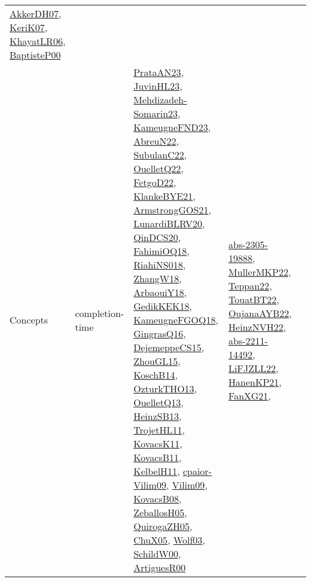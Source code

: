 {\begin{longtable}{lp{3cm}>{\raggedright}p{6cm}>{\raggedright}p{6cm}p{8cm}}
\href{papers/AkkerDH07.pdf}{AkkerDH07}\cite{AkkerDH07}, \href{papers/KeriK07.pdf}{KeriK07}\cite{KeriK07}, \href{articles/KhayatLR06.pdf}{KhayatLR06}\cite{KhayatLR06}, \href{articles/BaptisteP00.pdf}{BaptisteP00}\cite{BaptisteP00}\\
Concepts & completion-time & \href{articles/PrataAN23.pdf}{PrataAN23}\cite{PrataAN23}, \href{papers/JuvinHL23.pdf}{JuvinHL23}\cite{JuvinHL23}, \href{papers/Mehdizadeh-Somarin23.pdf}{Mehdizadeh-Somarin23}\cite{Mehdizadeh-Somarin23}, \href{papers/KameugneFND23.pdf}{KameugneFND23}\cite{KameugneFND23}, \href{articles/AbreuN22.pdf}{AbreuN22}\cite{AbreuN22}, \href{articles/SubulanC22.pdf}{SubulanC22}\cite{SubulanC22}, \href{papers/OuelletQ22.pdf}{OuelletQ22}\cite{OuelletQ22}, \href{articles/FetgoD22.pdf}{FetgoD22}\cite{FetgoD22}, \href{papers/KlankeBYE21.pdf}{KlankeBYE21}\cite{KlankeBYE21}, \href{papers/ArmstrongGOS21.pdf}{ArmstrongGOS21}\cite{ArmstrongGOS21}, \href{articles/LunardiBLRV20.pdf}{LunardiBLRV20}\cite{LunardiBLRV20}, \href{articles/QinDCS20.pdf}{QinDCS20}\cite{QinDCS20}, \href{articles/FahimiOQ18.pdf}{FahimiOQ18}\cite{FahimiOQ18}, \href{papers/RiahiNS018.pdf}{RiahiNS018}\cite{RiahiNS018}, \href{articles/ZhangW18.pdf}{ZhangW18}\cite{ZhangW18}, \href{papers/ArbaouiY18.pdf}{ArbaouiY18}\cite{ArbaouiY18}, \href{articles/GedikKEK18.pdf}{GedikKEK18}\cite{GedikKEK18}, \href{papers/KameugneFGOQ18.pdf}{KameugneFGOQ18}\cite{KameugneFGOQ18}, \href{papers/GingrasQ16.pdf}{GingrasQ16}\cite{GingrasQ16}, \href{papers/DejemeppeCS15.pdf}{DejemeppeCS15}\cite{DejemeppeCS15}, \href{papers/ZhouGL15.pdf}{ZhouGL15}\cite{ZhouGL15}, \href{papers/KoschB14.pdf}{KoschB14}\cite{KoschB14}, \href{articles/OzturkTHO13.pdf}{OzturkTHO13}\cite{OzturkTHO13}, \href{papers/OuelletQ13.pdf}{OuelletQ13}\cite{OuelletQ13}, \href{articles/HeinzSB13.pdf}{HeinzSB13}\cite{HeinzSB13}, \href{articles/TrojetHL11.pdf}{TrojetHL11}\cite{TrojetHL11}, \href{articles/KovacsK11.pdf}{KovacsK11}\cite{KovacsK11}, \href{articles/KovacsB11.pdf}{KovacsB11}\cite{KovacsB11}, \href{articles/KelbelH11.pdf}{KelbelH11}\cite{KelbelH11}, \href{papers/cpaior-Vilim09.pdf}{cpaior-Vilim09}\cite{cpaior-Vilim09}, \href{papers/Vilim09.pdf}{Vilim09}\cite{Vilim09}, \href{articles/KovacsB08.pdf}{KovacsB08}\cite{KovacsB08}, \href{articles/ZeballosH05.pdf}{ZeballosH05}\cite{ZeballosH05}, \href{papers/QuirogaZH05.pdf}{QuirogaZH05}\cite{QuirogaZH05}, \href{papers/ChuX05.pdf}{ChuX05}\cite{ChuX05}, \href{papers/Wolf03.pdf}{Wolf03}\cite{Wolf03}, \href{articles/SchildW00.pdf}{SchildW00}\cite{SchildW00}, \href{articles/ArtiguesR00.pdf}{ArtiguesR00}\cite{ArtiguesR00} & \href{articles/abs-2305-19888.pdf}{abs-2305-19888}\cite{abs-2305-19888}, \href{articles/MullerMKP22.pdf}{MullerMKP22}\cite{MullerMKP22}, \href{papers/Teppan22.pdf}{Teppan22}\cite{Teppan22}, \href{papers/TouatBT22.pdf}{TouatBT22}\cite{TouatBT22}, \href{papers/OujanaAYB22.pdf}{OujanaAYB22}\cite{OujanaAYB22}, \href{articles/HeinzNVH22.pdf}{HeinzNVH22}\cite{HeinzNVH22}, \href{articles/abs-2211-14492.pdf}{abs-2211-14492}\cite{abs-2211-14492}, \href{papers/LiFJZLL22.pdf}{LiFJZLL22}\cite{LiFJZLL22}, \href{papers/HanenKP21.pdf}{HanenKP21}\cite{HanenKP21}, \href{articles/FanXG21.pdf}{FanXG21}\cite{FanXG21}, 
\end{longtable}}
